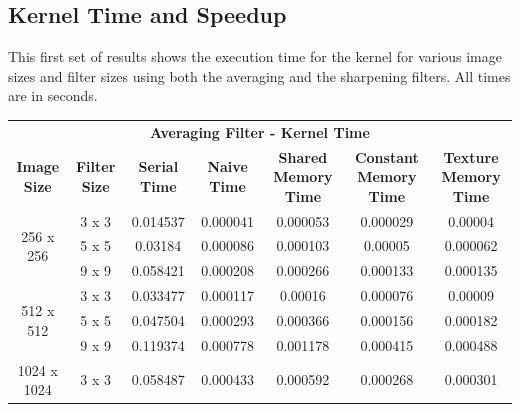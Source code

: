 \documentclass[10pt]{article}
\begin{document}
\subsection{Kernel Time and Speedup}
This first set of results shows the execution time for the kernel for various image sizes and filter sizes using both the averaging and the sharpening filters. All times are in seconds.
\begin{table}[H]
\small
\begin{tabular}{ccccccc}
\multicolumn{7}{c}{\textbf{Averaging Filter - Kernel Time}}                                                                                                                                   \\
\textbf{Image Size}          & \textbf{Filter Size} & \textbf{Serial Time} & \textbf{Naive Time} & \textbf{Shared Memory Time} & \textbf{Constant Memory Time} & \textbf{Texture Memory Time} \\ \hline
\multirow{3}{*}{256 x 256}   & 3 x 3                & 0.014537             & 0.000041            & 0.000053                    & 0.000029                      & 0.00004                      \\
                             & 5 x 5                & 0.03184              & 0.000086            & 0.000103                    & 0.00005                       & 0.000062                     \\
                             & 9 x 9                & 0.058421             & 0.000208            & 0.000266                    & 0.000133                      & 0.000135                     \\ \hline
\multirow{3}{*}{512 x 512}   & 3 x 3                & 0.033477             & 0.000117            & 0.00016                     & 0.000076                      & 0.00009                      \\
                             & 5 x 5                & 0.047504             & 0.000293            & 0.000366                    & 0.000156                      & 0.000182                     \\
                             & 9 x 9                & 0.119374             & 0.000778            & 0.001178                    & 0.000415                      & 0.000488                     \\ \hline
\multirow{3}{*}{1024 x 1024} & 3 x 3                & 0.058487             & 0.000433            & 0.000592                    & 0.000268                      & 0.000301                     \\

\end{tabular}
\end{table}
\end{document}

